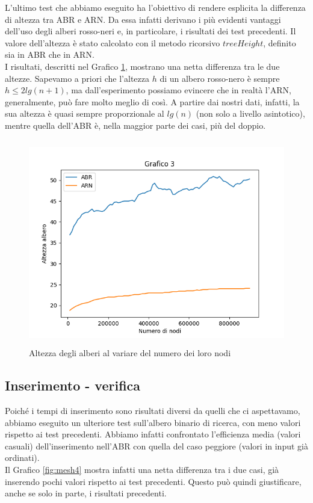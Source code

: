 \documentclass{article}
\begin{document}
L'ultimo test che abbiamo eseguito ha l'obiettivo di rendere esplicita la differenza di altezza tra ABR e ARN. Da essa infatti derivano i più evidenti vantaggi dell'uso degli alberi rosso-neri e, in particolare, i risultati dei test precedenti.
Il valore dell'altezza è stato calcolato con il metodo ricorsivo $treeHeight$, definito sia in ABR che in ARN.\\
I risultati, descritti nel Grafico \ref{fig:mesh3}, mostrano una netta differenza tra le due altezze. Sapevamo a priori che l'altezza $h$ di un albero rosso-nero è sempre $h\leq2lg(n+1)$, ma dall'esperimento possiamo evincere che in realtà l'ARN, generalmente, può fare molto meglio di così. A partire dai nostri dati, infatti, la sua altezza è quasi sempre proporzionale al $lg(n)$ (non solo a livello asintotico), mentre quella dell'ABR è, nella maggior parte dei casi, più del doppio.

\begin{figure}[H]
\includegraphics[height=9cm]{Figure_3.png}
\centering
\caption{Altezza degli alberi al variare del numero dei loro nodi}
\label{fig:mesh3}
\end{figure}

\subsection{Inserimento - verifica}
Poiché i tempi di inserimento sono risultati diversi da quelli che ci aspettavamo, abbiamo eseguito un ulteriore test sull'albero binario di ricerca, con meno valori rispetto ai test precedenti. Abbiamo infatti confrontato l'efficienza media (valori casuali) dell'inserimento nell'ABR con quella del caso peggiore (valori in input già ordinati).\\
Il Grafico \ref{fig:mesh4} mostra infatti una netta differenza tra i due casi, già inserendo pochi valori rispetto ai test precedenti. Questo può quindi giustificare, anche se solo in parte, i risultati precedenti.
\end{document}
